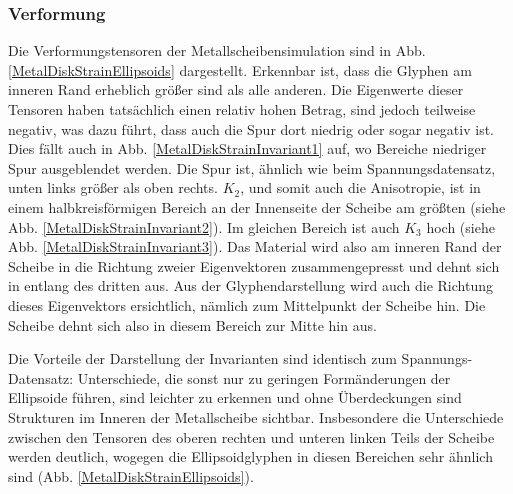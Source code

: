 \documentclass[a4paper,fontsize=12pt,toc=bib,halfparskip]{scrartcl}
\begin{document}
\subsubsection{Verformung}
Die Verformungstensoren der Metallscheibensimulation sind in Abb. \ref{MetalDiskStrainEllipsoids} dargestellt. Erkennbar ist, dass die Glyphen am inneren Rand erheblich gr\"o{\ss}er sind als alle anderen. Die Eigenwerte dieser Tensoren haben tats\"achlich einen relativ hohen Betrag, sind jedoch teilweise negativ, was dazu f\"uhrt, dass auch die Spur dort niedrig oder sogar negativ ist. Dies f\"allt auch in Abb. \ref{MetalDiskStrainInvariant1} auf, wo Bereiche niedriger Spur ausgeblendet werden.
Die Spur ist, \"ahnlich wie beim Spannungsdatensatz, unten links gr\"o{\ss}er als oben rechts. $K_2$, und somit auch die Anisotropie, ist in einem halbkreisf\"ormigen Bereich an der Innenseite der Scheibe am gr\"o{\ss}ten (siehe Abb. \ref{MetalDiskStrainInvariant2}). Im gleichen Bereich ist auch $K_3$ hoch (siehe Abb. \ref{MetalDiskStrainInvariant3}). Das Material wird also am inneren Rand der Scheibe in die Richtung zweier Eigenvektoren zusammengepresst und dehnt sich in entlang des dritten aus. Aus der Glyphendarstellung wird auch die Richtung dieses Eigenvektors ersichtlich, n\"amlich zum Mittelpunkt der Scheibe hin. Die Scheibe dehnt sich also in diesem Bereich zur Mitte hin aus.

Die Vorteile der Darstellung der Invarianten sind identisch zum Spannungs-Datensatz: Unterschiede, die sonst nur zu geringen Form\"anderungen der Ellipsoide f\"uhren, sind leichter zu erkennen und ohne \"Uberdeckungen sind Strukturen im Inneren der Metallscheibe sichtbar. Insbesondere die Unterschiede zwischen den Tensoren des oberen rechten und unteren linken Teils der Scheibe werden deutlich, wogegen die Ellipsoidglyphen in diesen Bereichen sehr \"ahnlich sind (Abb. \ref{MetalDiskStrainEllipsoids}).
\end{document}
